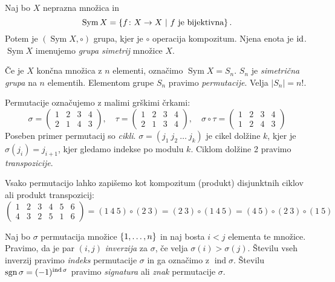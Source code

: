 \documentclass[12pt, a4paper]{article}
\begin{document}
\begin{definicija}
Naj bo $X$ neprazna množica in
\[
\operatorname{Sym}X=\left\{f\colon X\to X~\middle\vert~\text{$f$ je bijektivna}\right\}.
\]
Potem je $(\operatorname{Sym}X,\circ)$ grupa, kjer je $\circ$ operacija kompozitum. Njena enota je $\operatorname{id}$. $\operatorname{Sym}X$ imenujemo \emph{grupa simetrij} množice $X$.
\end{definicija}

\begin{definicija}
Če je $X$ končna množica z $n$ elementi, označimo $\operatorname{Sym}X=S_n$. $S_n$ je \emph{simetrična grupa} na $n$ elementih. Elementom grupe $S_n$ pravimo \emph{permutacije}. Velja $|S_n|=n!$.
\end{definicija}

Permutacije označujemo z malimi grškimi črkami:
\[
\sigma=
\begin{pmatrix}
1 & 2 & 3 & 4 \\
2 & 1 & 4 & 3
\end{pmatrix},
\quad
\tau=
\begin{pmatrix}
1 & 2 & 3 & 4 \\
2 & 1 & 3 & 4
\end{pmatrix},
\quad
\sigma\circ\tau=
\begin{pmatrix}
1 & 2 & 3 & 4 \\
1 & 2 & 4 & 3
\end{pmatrix}
\]
Poseben primer permutacij so \emph{cikli}. $\sigma=(j_1~j_2~\dots~j_k)$ je cikel dolžine $k$, kjer je $\sigma(j_i)=j_{i+1}$, kjer gledamo indekse po modulu $k$. Ciklom dolžine 2 pravimo \emph{transpozicije}.

Vsako permutacijo lahko zapišemo kot kompozitum (produkt) disjunktnih ciklov ali produkt transpozicij:
\[
\begin{pmatrix}
1 & 2 & 3 & 4 & 5 & 6 \\
4 & 3 & 2 & 5 & 1 & 6
\end{pmatrix}
=(1~4~5)\circ(2~3)=(2~3)\circ(1~4~5)
=(4~5)\circ(2~3)\circ(1~5)
\]

\begin{definicija}
Naj bo $\sigma$ permutacija množice $\left\{1,\dots,n\right\}$ in naj bosta $i<j$ elementa te množice. Pravimo, da je par $(i,j)$ \emph{inverzija} za $\sigma$, če velja $\sigma(i)>\sigma(j)$.  Številu vseh inverzij pravimo \emph{indeks} permutacije $\sigma$ in ga označimo z $\operatorname{ind}\sigma$. Številu $\operatorname{sgn}\sigma=(-1)^{\operatorname{ind}\sigma}$ pravimo \emph{signatura} ali \emph{znak} permutacije $\sigma$.
\end{definicija}
\end{document}

